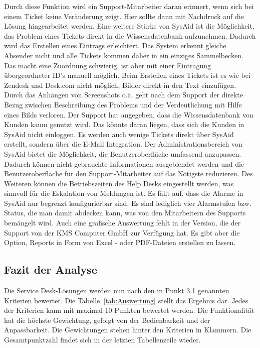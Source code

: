 Durch diese Funktion wird ein Support-Mitarbeiter daran erinnert, wenn sich bei einem Ticket keine Veränderung zeigt. Hier sollte dann mit Nachdruck auf die Lösung hingearbeitet werden. Eine weitere Stärke von SysAid ist die Möglichkeit, das Problem eines Tickets direkt in die Wissensdatenbank aufzunehmen. Dadurch wird das Erstellen eines Eintrags erleichtert. \newline
Das System erkennt  gleiche Absender nicht und alle Tickets kommen daher in ein einziges Sammelbecken. Das macht eine Zuordnung schwierig, ist aber mit einer Eintragung übergeordneter ID's manuell möglich.\newline
Beim Erstellen eines Tickets ist es wie bei Zendesk und Desk.com nicht möglich, Bilder direkt in den Text einzufügen. Durch das Anhängen von Screenshots o.ä. geht nach dem Support der direkte Bezug zwischen Beschreibung des Problems und der Verdeutlichung mit Hilfe eines Bilds verloren.\newline
Der Support hat angegeben, dass die Wissensdatenbank von Kunden kaum genutzt wird. Das könnte daran liegen, dass sich die Kunden in SysAid nicht einloggen. Es werden auch wenige Tickets direkt über SysAid erstellt, sondern über die E-Mail Integration.\newline
Der Administrationsbereich von SysAid bietet die Möglichkeit, die Benutzeroberfläche umfassend anzupassen. Dadurch können nicht gebrauchte Informationen ausgeblendet werden und die Benutzeroberfläche für den Support-Mitarbeiter auf das Nötigste reduzieren. Des Weiteren können die Betriebszeiten des Help Desks eingestellt werden, was sinnvoll für die Eskalation von Meldungen ist.\newline
Es fällt auf, dass die Alarme in SysAid nur begrenzt konfigurierbar sind. Es sind lediglich vier Alarmstufen bzw. Status, die man damit abdecken kann, was von den Mitarbeitern des Supports bemängelt wird. Auch eine grafische Auswertung fehlt in der Version, die der Support von der KMS Computer GmbH zur Verfügung hat. Es gibt aber die Option, Reports in Form von Excel - oder PDF-Dateien erstellen zu lassen.

\subsection{Fazit der Analyse}

\noindent
Die Service Desk-Lösungen werden nun nach den in Punkt 3.1 genannten Kriterien bewertet. Die Tabelle~\ref{tab:Auswertung} stellt das Ergebnis dar. Jedes der Kriterien kann mit maximal 10 Punkten bewertet werden. Die Funktionalität hat die höchste Gewichtung, gefolgt von der Bedienbarkeit und der Anpassbarkeit. Die Gewichtungen stehen hinter den Kriterien in Klammern. Die Gesamtpunktzahl findet sich in der letzten Tabellenzeile wieder.\\


